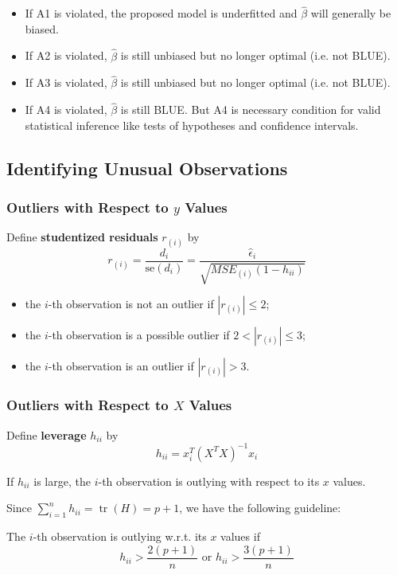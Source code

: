 \documentclass[11pt,a4paper]{article}
\DeclareMathOperator{\tr}{tr}
\begin{document}
\begin{itemize}
    \item If A1 is violated, the proposed model is underfitted and $\hat{\beta}$ will generally be biased.
    \item If A2 is violated, $\hat{\beta}$ is still unbiased but no longer optimal (i.e. not BLUE).
    \item If A3 is violated, $\hat{\beta}$ is still unbiased but no longer optimal (i.e. not BLUE).
    \item If A4 is violated, $\hat{\beta}$ is still BLUE. But A4 is necessary condition for valid statistical inference like tests of hypotheses and confidence intervals.
\end{itemize}

\subsection{Identifying Unusual Observations}
\subsubsection{\texorpdfstring{Outliers with Respect to $y$ Values}{Outliers with Respect to y Values}}
Define \textbf{studentized residuals} $r_{(i)}$ by
\[
r_{(i)} = \frac{d_i}{\text{se}(d_i)} = \frac{\hat{\epsilon}_i}{\sqrt{MSE_{(i)}(1 - h_{ii})}}
\]

\begin{itemize}
    \item the $i$-th observation is not an outlier if $|r_{(i)}| \leq 2$;
    \item the $i$-th observation is a possible outlier if $2 < |r_{(i)}| \leq 3$;
    \item the $i$-th observation is an outlier if $|r_{(i)}| > 3$.
\end{itemize}

\subsubsection{\texorpdfstring{Outliers with Respect to $X$ Values}{Outliers with Respect to X Values}}
Define \textbf{leverage} $h_{ii}$ by
\[
h_{ii} = x_i^T (X^TX)^{-1} x_i
\]

If $h_{ii}$ is large, the $i$-th observation is outlying with respect to its $x$ values. \par
Since $\sum_{i=1}^{n} h_{ii} = \tr(H) = p+1$, we have the following guideline: \par
The $i$-th observation is outlying w.r.t. its $x$ values if
\[
h_{ii} > \frac{2(p+1)}{n} \text{ or } h_{ii} > \frac{3(p+1)}{n}
\]
\end{document}
